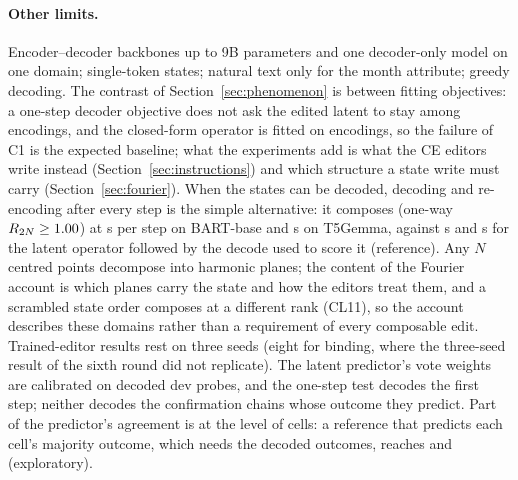\paragraph{Other limits.}
Encoder--decoder backbones up to 9B parameters and one decoder-only model on one domain; single-token states; natural text only for the
month attribute; greedy decoding.
The contrast of Section~\ref{sec:phenomenon} is between fitting objectives: a one-step decoder objective does not ask the edited latent to
stay among encodings, and the closed-form operator is fitted on encodings, so the failure of C1 is the expected baseline; what the
experiments add is what the CE editors write instead (Section~\ref{sec:instructions}) and which structure a state write must carry
(Section~\ref{sec:fourier}). When the states can be decoded, decoding and re-encoding after every step is the simple alternative: it composes (one-way
$R_{2N} \ge 1.00{}$) at \CLtwentyeightBartRe{} s per step on BART-base and \CLtwentyeightTfiveRe{} s on T5Gemma, against
\CLtwentyeightBartLat{} s and \CLtwentyeightTfiveLat{} s for the latent operator followed by the decode used to score it (reference).
Any $N$ centred points decompose into harmonic planes; the content of the Fourier account is which planes carry the state and how
the editors treat them, and a scrambled state order composes at a different rank (CL11), so the account describes these domains rather
than a requirement of every composable edit. Trained-editor results rest on three seeds (eight for binding, where the three-seed result
of the sixth round did not replicate).
The latent predictor's vote weights are calibrated on decoded dev probes, and the one-step test decodes the first step; neither
decodes the confirmation chains whose outcome they predict. Part of the predictor's agreement is at the level of cells: a reference that
predicts each cell's majority outcome, which needs the decoded outcomes, reaches \CLeightMajBart{} and \CLeightMajTfive{} (exploratory).


